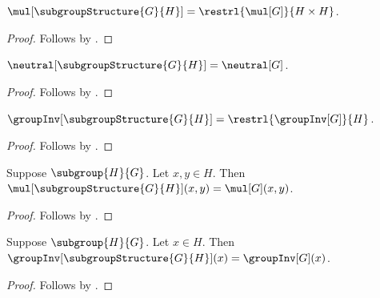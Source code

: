 \begin{proposition}\label{subgroup_structure_mul}
    $\mul[\subgroupStructure{G}{H}]
        =\restrl{\mul[G]}{H\times H}$.
\end{proposition}
\begin{proof}
    Follows by
        .
\end{proof}

\begin{proposition}\label{subgroup_structure_neutral}
    $\neutral[\subgroupStructure{G}{H}]=\neutral[G]$.
\end{proposition}
\begin{proof}
    Follows by
        .
\end{proof}

\begin{proposition}\label{subgroup_structure_inv}
    $\groupInv[\subgroupStructure{G}{H}]
        =\restrl{\groupInv[G]}{H}$.
\end{proposition}
\begin{proof}
    Follows by
        .
\end{proof}

\begin{proposition}\label{subgroup_structure_mul_apply}
    Suppose $\subgroup{H}{G}$.
    Let $x,y\in H$.
    Then
        $\mul[\subgroupStructure{G}{H}](x,y)=\mul[G](x,y)$.
\end{proposition}
\begin{proof}
    Follows by
        .
\end{proof}

\begin{proposition}\label{subgroup_structure_inv_apply}
    Suppose $\subgroup{H}{G}$.
    Let $x\in H$.
    Then
        $\groupInv[\subgroupStructure{G}{H}](x)=\groupInv[G](x)$.
\end{proposition}
\begin{proof}
    Follows by
        .
\end{proof}

